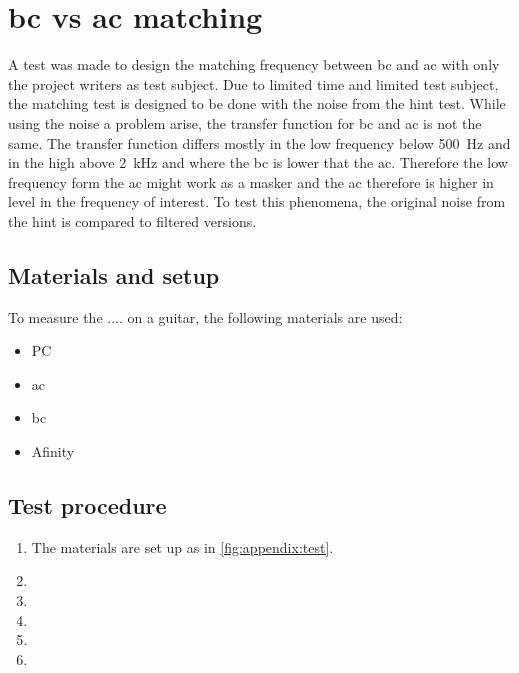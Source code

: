 \chapter*{\gls{bc} vs \gls{ac} matching}
A test was made to design the matching frequency between \gls{bc} and \gls{ac} with only the project writers as test subject. Due to limited time and limited test subject, the matching test is designed to be done with the noise from the \gls{hint} test. While using the noise a problem arise, the transfer function for \gls{bc} and \gls{ac} is not the same. The transfer function differs mostly in the low frequency below \SI{500}{\hertz} and in the high above \SI{2}{\kilo\hertz} and where the \gls{bc} is lower that the \gls{ac}. Therefore the low frequency form the \gls{ac} might work as a masker and the \gls{ac} therefore is higher in level in the frequency of interest. To test this phenomena, the original noise from the \gls{hint} is compared to filtered versions.

\section*{Materials and setup}
To measure the .... on a guitar, the following materials are used:
\begin{itemize}
\item PC
\item \gls{ac}
\item \gls{bc}
\item Afinity
\end{itemize}

%

\section*{Test procedure}


\begin{enumerate}
\item The materials are set up as in \autoref{fig:appendix:test}.
\item 
\item  
\item  
\item 
\item 
\end{enumerate}

